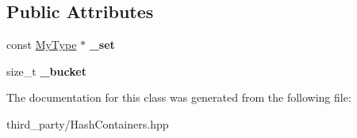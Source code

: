 \subsection*{Public Attributes}
\begin{DoxyCompactItemize}
\item 
\hypertarget{classemlib_1_1_hash_set_1_1const__iterator_a92cb925ad3be61a3bfb008e2284dd128}{const \hyperlink{classemlib_1_1_hash_set}{My\+Type} $\ast$ {\bfseries \+\_\+set}}\label{classemlib_1_1_hash_set_1_1const__iterator_a92cb925ad3be61a3bfb008e2284dd128}

\item 
\hypertarget{classemlib_1_1_hash_set_1_1const__iterator_a25661afdabc86883c07b5c71ff373d03}{size\+\_\+t {\bfseries \+\_\+bucket}}\label{classemlib_1_1_hash_set_1_1const__iterator_a25661afdabc86883c07b5c71ff373d03}

\end{DoxyCompactItemize}


The documentation for this class was generated from the following file\+:\begin{DoxyCompactItemize}
\item 
third\+\_\+party/Hash\+Containers.\+hpp\end{DoxyCompactItemize}
